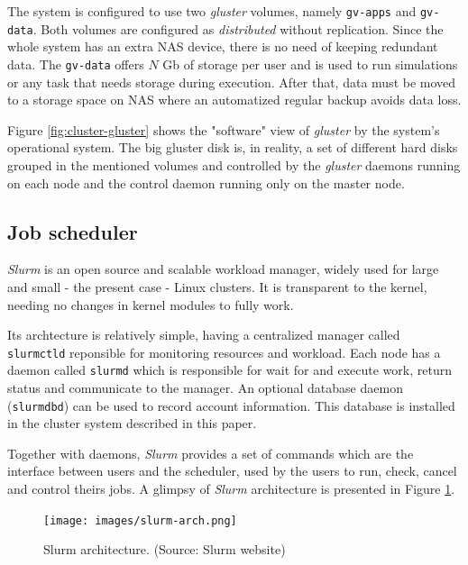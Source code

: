 \documentclass[twoside,a4paper,12pt,english]{inac19}
\begin{document}
The system is configured to use two \textit{gluster} volumes, namely \texttt{gv-apps} and \texttt{gv-data}. Both volumes
are configured as \textit{distributed} without replication. Since the whole system has an extra NAS device, there is
no need of keeping redundant data. The \texttt{gv-data} offers $N$ Gb of storage per user and is used to run simulations or any task that needs storage during execution. After that, data must be moved to a storage space on NAS where an automatized regular backup avoids data loss.

Figure \ref{fig:cluster-gluster} shows the "software" view of \textit{gluster} by the system's operational system. The big 
gluster disk is, in reality, a set of different hard disks grouped in the mentioned volumes and controlled by the 
\textit{gluster} daemons running on each node and the control daemon running only on the master node.

\subsection{Job scheduler}
\label{ssec:slurm}

\textit{Slurm}\cite{slurm} is an open source and scalable workload manager, widely used for large
and small - the present case - Linux clusters. It is transparent to the kernel, needing no changes in
kernel modules to fully work.

Its archtecture is relatively simple, having a centralized manager called \texttt{slurmctld} reponsible for
monitoring resources and workload. Each node has a daemon called \texttt{slurmd} which is responsible for
wait for and execute work, return status and communicate to the manager. An optional database daemon
(\texttt{slurmdbd}) can be used to record account information. This database is installed in the cluster
system described in this paper.

Together with daemons, \textit{Slurm} provides a set of commands which are the interface between users
and the scheduler, used by the users to run, check, cancel and control theirs jobs. A glimpsy of \textit{Slurm}
architecture is presented in Figure \ref{fig:slurm}.

\begin{figure}[h] %
  \centering\texttt{[image: images/slurm-arch.png]}
  \caption{Slurm architecture. (Source: Slurm website)}
  \label{fig:slurm}
\end{figure}
\end{document}
